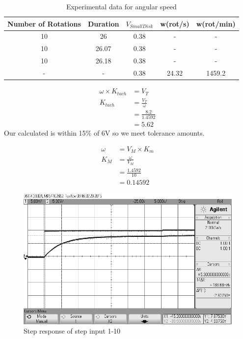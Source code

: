 \documentclass{article}
\begin{document}
\begin{table}[!htbp]
\centering
    \begin{tabular}{|c|c|c|c|c|}
        \hline
        \textbf{Number of Rotations} & \textbf{Duration} & $V_{SmallDisk}$ & w(rot/s) & w(rot/min) \\
        \hline
        10 & 26 & 0.38 & - & -\\
        \hline
        10 & 26.07 & 0.38 & - & -\\
        \hline
        10 & 26.18 & 0.38 & - & - \\
        \hline
        - & - & 0.38 & 24.32 & 1459.2\\
        \hline
    \end{tabular}
    \caption{Experimental data for angular speed}
\end{table}

\begin{align*}
    \omega \times K_{tach}&= V_T\\
    K_{tach} &= \frac{V_T}{\omega}\\
        &= \frac{8.2}{1.4592}\\
        & = 5.62
\end{align*}
Our calculated is within 15\% of 6V so we meet tolerance amounts.

\begin{align*}
    \omega &= V_M \times K_m\\
    K_M &= \frac{\omega}{V_M}\\
        &= \frac{1.4592}{10}\\
        &= 0.14592
\end{align*}

\begin{figure}[!htbp]
\centering
\includegraphics[width=7in]{step_response_5_2.png}
\caption{Step response of step input 1-10}
\end{figure}
\end{document}
